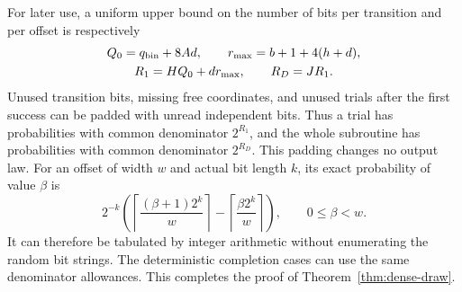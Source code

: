 For later use, a uniform upper bound on the number of bits per transition
and per offset is respectively
\begin{equation}\label{eq:dense-denominator-bounds}
 \begin{gathered}
 Q_0=q_{\rm bin}+8Ad,\qquad
 r_{\max}=b+1+4(h+d),\\
 R_1=HQ_0+dr_{\max},\qquad R_D=JR_1.
 \end{gathered}
\end{equation}
Unused transition bits, missing free coordinates, and unused trials
after the first success can be padded with unread independent bits.
Thus a trial has probabilities with common denominator $2^{R_1}$, and
the whole subroutine has probabilities with common denominator
$2^{R_D}$.  This padding changes no output law.  For an offset of width
$w$ and actual bit length $k$, its exact probability of value $\beta$ is
\begin{equation}\label{eq:dense-offset-count}
 2^{-k}\left(
 \left\lceil\frac{(\beta+1)2^k}{w}\right\rceil-
 \left\lceil\frac{\beta2^k}{w}\right\rceil\right),
 \qquad 0\le\beta<w.
\end{equation}
It can therefore be tabulated by integer arithmetic without enumerating
the random bit strings.  The deterministic completion cases can use the
same denominator allowances.  This completes the proof of
Theorem~\ref{thm:dense-draw}.
